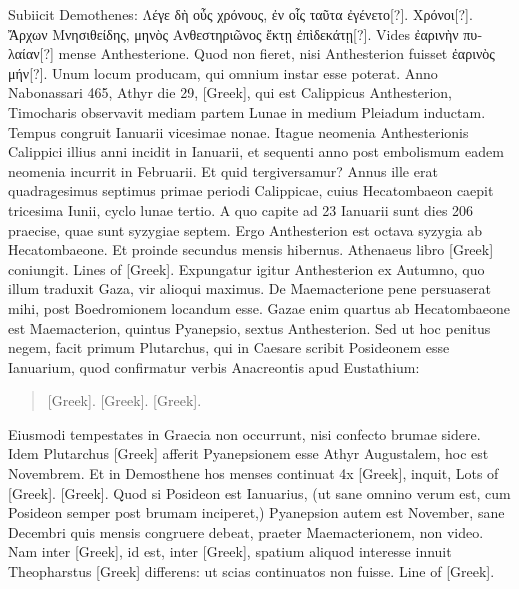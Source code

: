 Subiicit Demothenes:
 \textgreek{Λέγε δὴ οὖς χρόνους, ἐν οἷς ταῦτα ἐγένετο}[?].
\textgreek{Χρόνοι}[?].
\textgreek{Ἄρχων
Μνησιθείδης, μηνὸς Ανθεστηριῶνος ἕκτῃ ἐπὶδεκάτῃ[?]}.
Vides \textgreek{ἐαρινὴν πυλαίαν[?]}
mense Anthesterione.
Quod non fieret, nisi Anthesterion fuisset \textgreek{ἐαρινὸς
μήν[?]}.
Unum locum producam, qui omnium instar esse poterat.
Anno
Nabonassari 465, Athyr die 29, \textgreek{[Greek]}, qui est Calippicus
Anthesterion, Timocharis observavit mediam partem Lunae in
medium Pleiadum inductam.
Tempus congruit Ianuarii vicesimae
nonae.
Itague neomenia Anthesterionis Calippici illius anni incidit in
 Ianuarii, et sequenti anno post embolismum eadem
 neomenia incurrit
in  Februarii.
Et quid tergiversamur?
Annus ille erat quadragesimus
septimus primae periodi Calippicae, cuius Hecatombaeon caepit
tricesima Iunii, cyclo lunae tertio.
A quo capite ad 23 Ianuarii sunt dies
206 praecise, quae sunt syzygiae septem.
Ergo Anthesterion est octava
syzygia ab Hecatombaeone.
Et proinde secundus mensis hibernus.
Athenaeus
libro  \textgreek{[Greek]} coniungit.
\textgreek{Lines of [Greek]}.
Expungatur igitur Anthesterion ex Autumno, quo
illum traduxit Gaza, vir alioqui maximus.
De Maemacterione pene
persuaserat mihi, post Boedromionem locandum esse.
Gazae enim
quartus ab Hecatombaeone est Maemacterion, quintus Pyanepsio, sextus
Anthesterion.
Sed ut hoc penitus negem, facit primum Plutarchus,
qui in Caesare scribit Posideonem esse Ianuarium, quod confirmatur
verbis Anacreontis apud Eustathium:
\begin{verse}
  \textgreek{[Greek]}.
  \textgreek{[Greek]}.
  \textgreek{[Greek]}.
\end{verse}
Eiusmodi tempestates in Graecia non occurrunt, nisi confecto brumae
sidere.
Idem Plutarchus \textgreek{[Greek]} afferit Pyanepsionem esse Athyr
Augustalem, hoc est Novembrem.
Et in Demosthene hos menses
continuat \textgreek{4x [Greek]}, inquit, \textgreek{Lots of [Greek]}.
\textgreek{[Greek]}.
Quod si Posideon est Ianuarius, (ut sane omnino verum est, cum Posideon
semper post brumam inciperet,) Pyanepsion autem est November,
sane Decembri quis mensis congruere debeat, praeter Maemacterionem,
non video.
Nam inter \textgreek{[Greek]}, id est, inter
\textgreek{[Greek]}, spatium aliquod interesse innuit Theopharstus
\textgreek{[Greek]} differens: ut scias continuatos non fuisse.
\textgreek{Line of [Greek]}.


